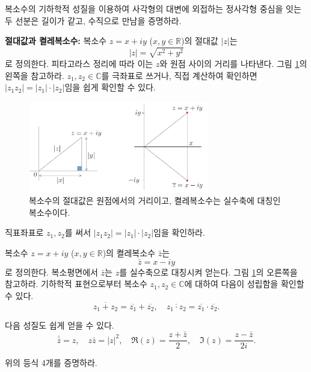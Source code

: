 \begin{salt_exercise} \label{ex-1-13}
복소수의 기하학적 성질을 이용하여 
사각형의 대변에 외접하는 정사각형 중심을 잇는 두 선분은
길이가 같고, 수직으로 만남을 증명하라.
\end{salt_exercise}

{\bf 절대값과 켤레복소수: }
복소수 $z=x+iy$ ($x,y\in\mathbb R$)의 절대값 $|z|$는
$$
|z| = \sqrt{x^2+y^2}
$$
로 정의한다.
피타고라스 정리에 따라 이는 $z$와 원점 사이의 거리를 나타낸다.
그림 \ref{fig-1-9}의 왼쪽을 참고하라.
$z_1, z_2\in \mathbb C$를 극좌표로 쓰거나, 직접 계산하여 확인하면
$|z_1z_2| = |z_1|\cdot |z_2|$임을 쉽게 확인할 수 있다.

\begin{figure}[!h]
\begin{center}
\includegraphics[width=0.7\textwidth]{./SaltChapter/figs/fig-1-9}
\end{center}
\caption{복소수의 절대값은 원점에서의 거리이고, 켤레복소수는 실수축에 대칭인 복소수이다.}
\label{fig-1-9}
\end{figure}

\begin{salt_exercise} \label{ex-1-14}
직표좌표로 $z_1, z_2$를 써서 $|z_1z_2| = |z_1|\cdot |z_2|$임을 확인하라.
\end{salt_exercise}

복소수 $z=x+iy$ ($x,y\in\mathbb R$)의 켤레복소수 $\bar z$는
$$
\bar z = x - iy
$$
로 정의한다.
복소평면에서 $\bar z$는 $z$를 실수축으로 대칭시켜 얻는다.
그림 \ref{fig-1-9}의 오른쪽을 참고하라.
기하학적 표현으로부터 복소수 $z_1, z_2\in\mathbb C$에 대하여
다음이 성립함을 확인할 수 있다.
$$
\overline{z_1+z_2} = \overline{z_1} + \overline{z_2},
\quad
\overline{z_1\cdot z_2} = \overline{z_1} \cdot \overline{z_2}.
$$

다음 성질도 쉽게 얻을 수 있다.
$$
\bar{\bar z} = z, \quad z\bar z  = |z|^2, \quad
\Re(z) = \frac{z+\bar z}2, \quad \Im(z) = \frac{z-\bar z}{2i}.
$$

\begin{salt_exercise} \label{ex-1-15}
위의 등식 4개를 증명하라.
\end{salt_exercise}

